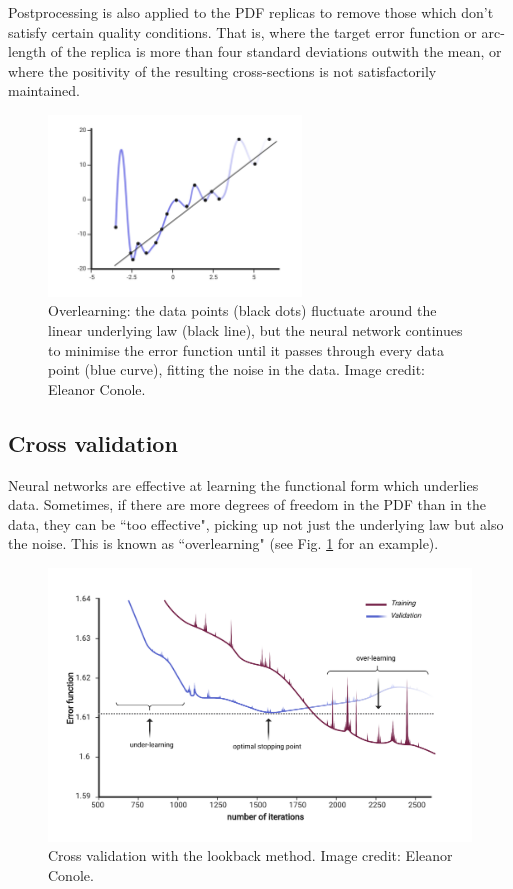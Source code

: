 Postprocessing is also applied to the PDF replicas to remove those which don't satisfy certain quality conditions. That is, where the target error function or arc-length of the replica is more than four standard deviations outwith the mean, or where the positivity of the resulting cross-sections is not satisfactorily maintained. 
\begin{figure}[H]
\centering
\includegraphics[width=0.6\textwidth]{background/eleanor_overlearning.pdf}
\caption{\label{fig:overlearning}Overlearning: the data points (black dots) fluctuate around the linear underlying law (black line), but the neural network continues to minimise the error function until it passes through every data point (blue curve), fitting the noise in the data. Image credit: Eleanor Conole.}
\end{figure}

\subsection{Cross validation}
Neural networks are effective at learning the functional form which underlies data. Sometimes, if there are more degrees of freedom in the PDF than in the data, they can be ``too effective", picking up not just the underlying law but also the noise. This is known as ``overlearning" (see Fig. \ref{fig:overlearning} for an example).
\begin{figure}[h]
\centering
\includegraphics[width=\textwidth]{background/eleanor_lookback.pdf}
\caption{\label{fig:crossvalidation}Cross validation with the lookback method. Image credit: Eleanor Conole.}
\end{figure}

